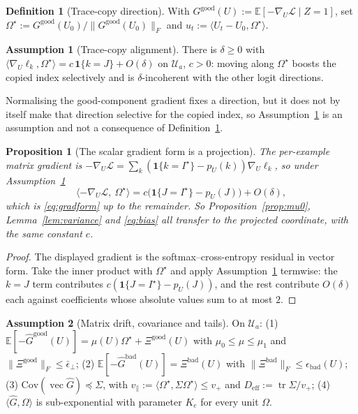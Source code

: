 \documentclass{article}
\theoremstyle{plain}
\newtheorem{proposition}{Proposition}
\theoremstyle{definition}
\newtheorem{definition}{Definition}
\newtheorem{assumption}{Assumption}
\theoremstyle{remark}
\newcommand{\E}{\mathbb{E}}
\newcommand{\1}{\mathbf{1}}
\newcommand{\cL}{\mathcal{L}}
\newcommand{\cU}{\mathcal{U}}
\newcommand{\good}{\mathrm{good}}
\newcommand{\bad}{\mathrm{bad}}
\newcommand{\Tr}{\operatorname{tr}}
\newcommand{\vecop}{\operatorname{vec}}
\newcommand{\Om}{\Omega}
\begin{document}
\begin{definition}[Trace-copy direction]
\label{def:tracedir}
With $G^\good(U) := \E[-\nabla_U\cL\mid Z=1]$, set
$\Om^\star := G^\good(U_0)/\|G^\good(U_0)\|_F$ and
$u_t := \langle U_t - U_0,\Om^\star\rangle$.
\end{definition}

\begin{assumption}[Trace-copy alignment]
\label{ass:alignment}
There is $\delta\ge0$ with
$\langle\nabla_U\ell_k,\Om^\star\rangle = c\,\1\{k = J\}+O(\delta)$ on $\cU_a$,
$c>0$: moving along $\Om^\star$ boosts the copied index selectively and is
$\delta$-incoherent with the other logit directions.
\end{assumption}

Normalising the good-component gradient fixes a direction, but it does not by
itself make that direction selective for the copied index, so
Assumption~\ref{ass:alignment} is an assumption and not a consequence of
Definition~\ref{def:tracedir}.

\begin{proposition}[The scalar gradient form is a projection]
\label{prop:projection}
The per-example matrix gradient is
$-\nabla_U\cL = \sum_k(\1\{k=I^\star\}-p_U(k))\nabla_U\ell_k$, so under
Assumption~\ref{ass:alignment}
\begin{equation}
\label{eq:matproj}
\langle-\nabla_U\cL,\ \Om^\star\rangle
= c\big(\1\{J=I^\star\}-p_U(J)\big) + O(\delta),
\end{equation}
which is \eqref{eq:gradform} up to the remainder. So
Proposition~\ref{prop:mu0}, Lemma~\ref{lem:variance} and \eqref{eq:bias} all
transfer to the projected coordinate, with the same constant $c$.
\end{proposition}

\begin{proof}
The displayed gradient is the softmax--cross-entropy residual in vector form.
Take the inner product with $\Om^\star$ and apply
Assumption~\ref{ass:alignment} termwise: the $k=J$ term contributes
$c(\1\{J=I^\star\}-p_U(J))$, and the rest contribute $O(\delta)$ each against
coefficients whose absolute values sum to at most $2$.
\end{proof}

\begin{assumption}[Matrix drift, covariance and tails]
\label{ass:matrix}
On $\cU_a$: (1) $\E[-\hat G^\good(U)] = \mu(U)\Om^\star+\Xi^\good(U)$ with
$\mu_0\le\mu\le\mu_1$ and $\|\Xi^\good\|_F\le\bar\epsilon_\perp$;
(2) $\E[-\hat G^\bad(U)] = \Xi^\bad(U)$ with $\|\Xi^\bad\|_F\le\epsilon_\bad(U)$;
(3) $\mathrm{Cov}(\vecop\hat G)\preceq\Sigma$, with
$v_\parallel := \langle\Om^\star,\Sigma\Om^\star\rangle\le v_+$ and
$D_{\mathrm{eff}} := \Tr\Sigma/v_+$;
(4) $\langle\hat G,\Om\rangle$ is sub-exponential with parameter $K_e$ for every
unit $\Om$.
\end{assumption}
\end{document}
